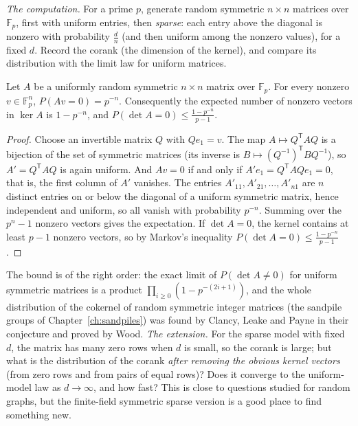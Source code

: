 \emph{The computation.} For a prime $p$, generate random symmetric $n\times n$ matrices over $\mathbb F_p$, first with uniform entries, then \emph{sparse}: each entry above the diagonal is nonzero with probability $\frac dn$ (and then uniform among the nonzero values), for a fixed $d$. Record the corank (the dimension of the kernel), and compare its distribution with the limit law for uniform matrices.

\begin{proposition}\label{prop:symkernel}
Let $A$ be a uniformly random symmetric $n\times n$ matrix over $\mathbb F_p$. For every nonzero $v\in\mathbb F_p^n$, $P(Av=0)=p^{-n}$. Consequently the expected number of nonzero vectors in $\ker A$ is $1-p^{-n}$, and $P(\det A=0)\le\frac{1-p^{-n}}{p-1}$.
\end{proposition}

\begin{proof}
Choose an invertible matrix $Q$ with $Qe_1=v$. The map $A\mapsto Q^{\mathsf T}AQ$ is a bijection of the set of symmetric matrices (its inverse is $B\mapsto(Q^{-1})^{\mathsf T}BQ^{-1}$), so $A'=Q^{\mathsf T}AQ$ is again uniform. And $Av=0$ if and only if $A'e_1=Q^{\mathsf T}AQe_1=0$, that is, the first column of $A'$ vanishes. The entries $A'_{11},A'_{21},\dots,A'_{n1}$ are $n$ distinct entries on or below the diagonal of a uniform symmetric matrix, hence independent and uniform, so all vanish with probability $p^{-n}$. Summing over the $p^n-1$ nonzero vectors gives the expectation. If $\det A=0$, the kernel contains at least $p-1$ nonzero vectors, so by Markov's inequality $P(\det A=0)\le\frac{1-p^{-n}}{p-1}$.
\end{proof}

The bound is of the right order: the exact limit of $P(\det A\ne0)$ for uniform symmetric matrices is a product $\prod_{i\ge0}(1-p^{-(2i+1)})$, and the whole distribution of the cokernel of random symmetric integer matrices (the sandpile groups of Chapter~\ref{ch:sandpiles}) was found by Clancy, Leake and Payne in their conjecture and proved by Wood. \emph{The extension.} For the sparse model with fixed $d$, the matrix has many zero rows when $d$ is small, so the corank is large; but what is the distribution of the corank \emph{after removing the obvious kernel vectors} (from zero rows and from pairs of equal rows)? Does it converge to the uniform-model law as $d\to\infty$, and how fast? This is close to questions studied for random graphs, but the finite-field symmetric sparse version is a good place to find something new.


